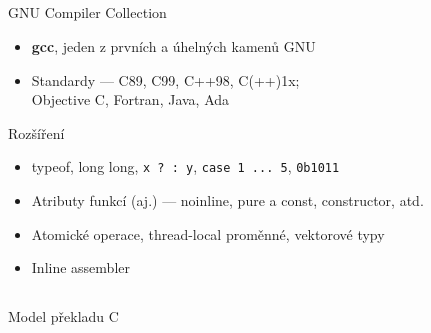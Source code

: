 \documentclass{beamer}
\begin{document}
\subsection{}
\begin{frame}{GNU Compiler Collection}
\begin{itemize}
\item {\bf gcc}, jeden z prvních a úhelných kamenů GNU
\item Standardy --- C89, C99, C++98, C(++)1x; \\ Objective C, Fortran, Java, Ada
\end{itemize}
\begin{block}{Rozšíření}
\begin{itemize}
\item typeof, long long, {\tt x ? : y}, {\tt case 1 ... 5}, {\tt 0b1011}
\item Atributy funkcí (aj.) --- noinline, pure a const, constructor, atd.
\item Atomické operace, thread-local proměnné, vektorové typy
\item Inline assembler
\end{itemize}
\end{block}
\end{frame}

\subsection{}
\begin{frame}{Model překladu C}
\end{frame}
\end{document}
